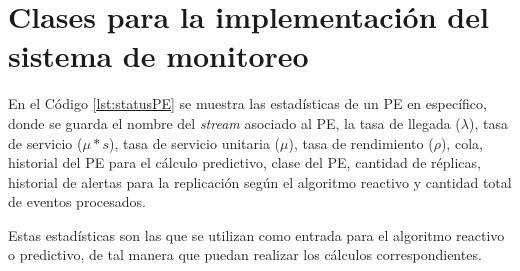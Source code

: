 \chapter{Clases para la implementación del sistema de monitoreo}
\label{apendice:clases}

En el Código \ref{lst:statusPE} se muestra las estadísticas de un PE en específico, donde se guarda el nombre del \textit{stream} asociado al PE, la tasa de llegada ($\lambda$), tasa de servicio ($\mu * s$), tasa de servicio unitaria ($\mu$), tasa de rendimiento ($\rho$), cola, historial del PE para el cálculo predictivo, clase del PE, cantidad de réplicas, historial de alertas para la replicación según el algoritmo reactivo y cantidad total de eventos procesados.

Estas estadísticas son las que se utilizan como entrada para el algoritmo reactivo o predictivo, de tal manera que puedan realizar los cálculos correspondientes.

